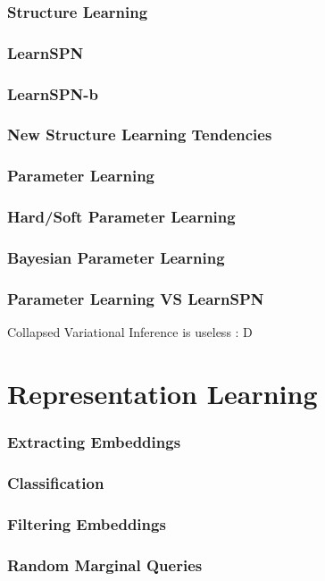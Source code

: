 \documentclass[xcolor={usenames,dvipsnames,svgnames}, compress]{beamer}
\begin{document}
\begin{frame}
  \frametitle{Structure Learning}
\end{frame}

\begin{frame}
  \frametitle{LearnSPN}
\end{frame}

\begin{frame}
  \frametitle{LearnSPN-b}
\end{frame}

\begin{frame}
  \frametitle{New Structure Learning Tendencies}
\end{frame}

\begin{frame}
\frametitle{Parameter Learning}
\end{frame}

\begin{frame}
  \frametitle{Hard/Soft Parameter Learning}
\end{frame}

\begin{frame}
  \frametitle{Bayesian Parameter Learning}
\end{frame}

\begin{frame}
  \frametitle{Parameter Learning VS LearnSPN}
  Collapsed Variational Inference is useless : D
\end{frame}

\section{Representation Learning}
{
  \begin{frame}
    \sectionpage
  \end{frame}
}

\begin{frame}
  \frametitle{Extracting Embeddings}
\end{frame}

\begin{frame}
  \frametitle{Classification}
\end{frame}

\begin{frame}
  \frametitle{Filtering Embeddings}
\end{frame}

\begin{frame}
  \frametitle{Random Marginal Queries}
\end{frame}
\end{document}
